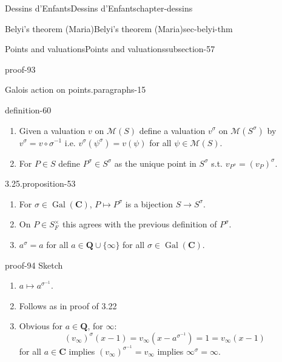 \documentclass[oneside,10pt,]{book}
\numberwithin{equation}{section}
\newcommand{\QQ}{\mathbf{Q}}
\newcommand{\CC}{\mathbf{C}}
\begin{document}
\begin{chapterptx}{Dessins d'Enfants}{}{Dessins d'Enfants}{}{}{chapter-dessins}
\begin{sectionptx}{Belyi's theorem (Maria)}{}{Belyi's theorem (Maria)}{}{}{sec-belyi-thm}
\begin{subsectionptx}{Points and valuations}{}{Points and valuations}{}{}{subsection-57}
\begin{proofptx}{}{proof-93}
\end{proofptx}
\begin{paragraphs}{Galois action on points.}{paragraphs-15}%
\begin{definition}{}{definition-60}%
\hypertarget{p-624}{}%
\leavevmode%
\begin{enumerate}
\item\hypertarget{li-125}{}Given a valuation \(v\) on \(\mathcal M(S)\) define a valuation \(v^\sigma\) on \(\mathcal M(S^\sigma)\) by \(v^\sigma = v\circ \sigma^{-1}\) i.e. \(v^\sigma(\psi^\sigma) = v(\psi)\) for all \(\psi \in \mathcal M(S)\).%
\item\hypertarget{li-126}{}For \(P \in S\) define \(P^\sigma \in S^\sigma\) as the unique point in \(S^\sigma\) s.t. \(v_{P^\sigma} = (v_P)^\sigma\).%
\end{enumerate}
%
\end{definition}
\begin{proposition}{3.25.}{}{proposition-53}%
\hypertarget{p-625}{}%
\leavevmode%
\begin{enumerate}
\item\hypertarget{li-127}{}For \(\sigma\in \operatorname{Gal}(\CC)\), \(P\mapsto P^\sigma\) is a bijection \(S\to S^\sigma\).%
\item\hypertarget{li-128}{}On \(P \in S_F^\times\) this agrees with the previous definition of \(P^\sigma\).%
\item\hypertarget{li-129}{}\(a^\sigma = a\) for all \(a\in \QQ \cup \{\infty\}\) for all \(\sigma \in \operatorname{Gal}(\CC)\).%
\end{enumerate}
%
\end{proposition}
\begin{proofptx}{}{proof-94}
\hypertarget{p-626}{}%
Sketch\leavevmode%
\begin{enumerate}
\item\hypertarget{li-130}{}\(a \mapsto a^{\sigma^{-1}}\).%
\item\hypertarget{li-131}{}Follows as in proof of 3.22%
\item\hypertarget{li-132}{}Obvious for \(a \in \QQ\), for \(\infty\):%
\begin{equation*}
(v_\infty)^\sigma (x-1) = v_\infty(x- a^{\sigma^{-1}}) = 1 = v_\infty(x-1)
\end{equation*}
for all \(a\in \CC\) implies \((v_\infty)^{\sigma^{-1}} = v_\infty\) implies \(\infty^\sigma  = \infty\).%
\end{enumerate}
%
\end{proofptx}
\end{paragraphs}%

\end{subsectionptx}
\end{sectionptx}
\end{chapterptx}
\end{document}
